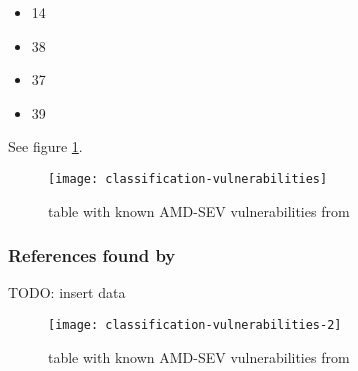 \begin{itemize}
\item 14  \cite{buhren_insecure_2019}
\item 38  \cite{li_exploiting_2019}
\item 37  \cite{li_exploiting_2019}
\item 39  \cite{2019-werner}
\end{itemize}
See figure \ref{fig:classification-vulnerabilities}.

\begin{figure}[!ht]
    \centering
    \texttt{[image: classification-vulnerabilities]}
    \caption{table with known AMD-SEV vulnerabilities  
    from \cite{leijonberg_viability_2021}}
    \label{fig:classification-vulnerabilities}
\end{figure}


\subsubsection{References found by \cite{li_crossline_2021} }
TODO:  insert data


\begin{figure}[!ht]
    \centering
    \texttt{[image: classification-vulnerabilities-2]}
    \caption{table with known AMD-SEV vulnerabilities  
    from \cite{li_crossline_2021}}
    \label{fig:classification-vulnerabilities-2}
\end{figure}

\newpage
\newpage

\newpage

\newpage
\newpage
\newpage

\newpage

\newpage
\newpage
\newpage
\newpage
\newpage
\newpage
\newpage
